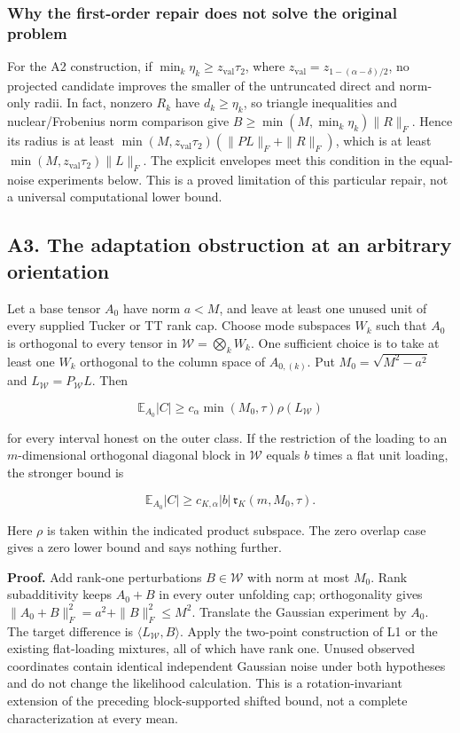 \subsubsection{Why the first-order repair does not solve the original
problem}\label{why-the-first-order-repair-does-not-solve-the-original-problem}

For the A2 construction, if \(\min_k\eta_k\ge z_{\mathrm{val}}\tau_2\),
where \(z_{\mathrm{val}}=z_{1-(\alpha-\delta)/2}\), no projected
candidate improves the smaller of the untruncated direct and norm-only
radii. In fact, nonzero \(R_k\) have \(d_k\ge\eta_k\), so triangle
inequalities and nuclear/Frobenius norm comparison give
\(B\ge\min(M,\min_k\eta_k)\|R\|_F\). Hence its radius is at least
\(\min(M,z_{\mathrm{val}}\tau_2)(\|PL\|_F+\|R\|_F)\), which is at least
\(\min(M,z_{\mathrm{val}}\tau_2)\|L\|_F\). The explicit envelopes meet
this condition in the equal-noise experiments below. This is a proved
limitation of this particular repair, not a universal computational
lower bound.

\subsection{A3. The adaptation obstruction at an arbitrary
orientation}\label{a3.-the-adaptation-obstruction-at-an-arbitrary-orientation}\label{sup:A3}

Let a base tensor \(A_0\) have norm \(a<M\), and leave at least one
unused unit of every supplied Tucker or TT rank cap. Choose mode
subspaces \(W_k\) such that \(A_0\) is orthogonal to every tensor in
\(\mathcal W=\bigotimes_k W_k\). One sufficient choice is to take at
least one \(W_k\) orthogonal to the column space of \(A_{0,(k)}\). Put
\(M_0=\sqrt{M^2-a^2}\) and \(L_{\mathcal W}=P_{\mathcal W}L\). Then

\[\mathbb E_{A_0}|C|\ge c_\alpha\min(M_0,\tau)\rho(L_{\mathcal W})\]

for every interval honest on the outer class. If the restriction of the
loading to an \(m\)-dimensional orthogonal diagonal block in
\(\mathcal W\) equals \(b\) times a flat unit loading, the stronger
bound is

\[\mathbb E_{A_0}|C|\ge c_{K,\alpha}|b|\,
\mathfrak r_K(m,M_0,\tau).\]

Here \(\rho\) is taken within the indicated product subspace. The zero
overlap case gives a zero lower bound and says nothing further.

\textbf{Proof.} Add rank-one perturbations \(B\in\mathcal W\) with norm
at most \(M_0\). Rank subadditivity keeps \(A_0+B\) in every outer
unfolding cap; orthogonality gives
\(\|A_0+B\|_F^2=a^2+\|B\|_F^2\le M^2\). Translate the Gaussian
experiment by \(A_0\). The target difference is
\(\langle L_{\mathcal W},B\rangle\). Apply the two-point construction of
L1 or the existing flat-loading mixtures, all of which have rank one.
Unused observed coordinates contain identical independent Gaussian noise
under both hypotheses and do not change the likelihood calculation. This
is a rotation-invariant extension of the preceding block-supported
shifted bound, not a complete characterization at every mean.

